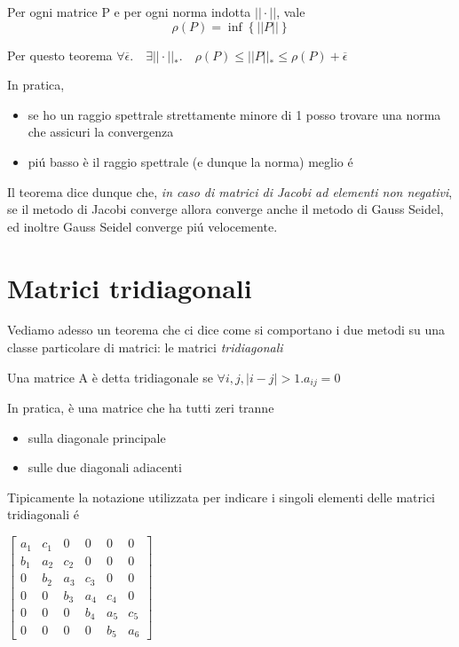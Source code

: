 \begin{theo}
\label{th:raggio-spettrale-norme-indotte}
Per ogni matrice P e per ogni norma indotta $ ||\cdot|| $, vale
  \[ \rho(P) = \inf \left\lbrace ||P|| \right\rbrace \] 
\end{theo}

Per questo teorema $ \forall \overline{ \epsilon }.\quad \exists ||\cdot||_*.\quad \rho(P) \leq ||P||_* \leq \rho(P) + \overline{ \epsilon } $

In pratica, 
\begin{itemize}
\item se ho un raggio spettrale strettamente minore di 1 posso trovare una norma che assicuri la convergenza
\item pi\'u basso \`e il raggio spettrale (e dunque la norma) meglio \'e
\end{itemize}

Il teorema dice dunque che, \emph{in caso di matrici di Jacobi ad elementi non negativi}, se il metodo di Jacobi converge allora converge anche il metodo di Gauss Seidel, ed inoltre Gauss Seidel converge pi\'u velocemente.


\section{Matrici tridiagonali}
Vediamo adesso un teorema che ci dice come si comportano i due metodi su una classe particolare di matrici: le matrici \emph{tridiagonali}

\begin{defn}
Una matrice A \`e detta tridiagonale se $ \forall i,j, | i - j | > 1.a_{ij} = 0 $
\end{defn}

In pratica, \`e una matrice che ha tutti zeri tranne
\begin{itemize}
\item sulla diagonale principale
\item sulle due diagonali adiacenti
\end{itemize}

Tipicamente la notazione utilizzata per indicare i singoli elementi delle matrici tridiagonali \'e

$\left[ \begin{array}{cccccc}
a_{1} & c_{1} & 0 & 0 & 0 & 0 \\ 
b_{1} & a_{2} & c_{2} & 0 & 0 & 0 \\ 
0 & b_{2} & a_{3} & c_{3} & 0 & 0 \\ 
0 & 0 & b_{3} & a_{4} & c_{4} & 0 \\ 
0 & 0 & 0 & b_{4} & a_{5} & c_{5} \\ 
0 & 0 & 0 & 0 & b_{5} & a_{6}
\end{array}  \right]$

